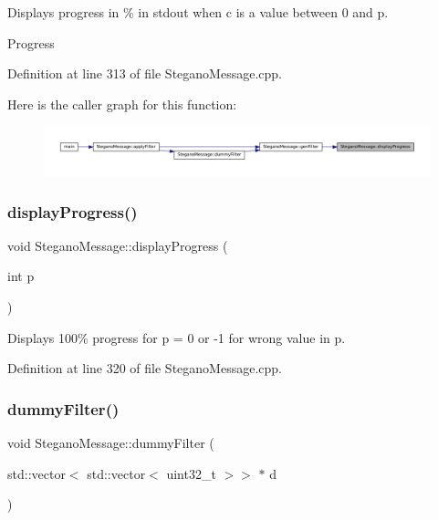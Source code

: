 Displays progress in \% in stdout when c is a value between 0 and p. 

Progress 

Definition at line 313 of file Stegano\+Message.\+cpp.

Here is the caller graph for this function\+:
\nopagebreak
\begin{figure}[H]
\begin{center}
\leavevmode
\includegraphics[width=350pt]{classSteganoMessage_a50936bb2352eaaa1112280c2ac3ca2d5_icgraph}
\end{center}
\end{figure}
\mbox{\label{classSteganoMessage_aa6e24f6ed5afcf38dcba28fb91a74d21}} 
\subsubsection{\texorpdfstring{displayProgress()}{displayProgress()}\hspace{0.1cm}{\footnotesize\ttfamily [2/2]}}
{\footnotesize\ttfamily void Stegano\+Message\+::display\+Progress (\begin{DoxyParamCaption}\item[{int}]{p }\end{DoxyParamCaption})\hspace{0.3cm}{\ttfamily [private]}}



Displays 100\% progress for p = 0 or -\/1 for wrong value in p. 



Definition at line 320 of file Stegano\+Message.\+cpp.

\mbox{\label{classSteganoMessage_a1a26242c2e6d146cba1ad6831ab60ba7}} 
\subsubsection{\texorpdfstring{dummyFilter()}{dummyFilter()}}
{\footnotesize\ttfamily void Stegano\+Message\+::dummy\+Filter (\begin{DoxyParamCaption}\item[{std\+::vector$<$ std\+::vector$<$ uint32\+\_\+t $>$$>$ $\ast$}]{d }\end{DoxyParamCaption})\hspace{0.3cm}{\ttfamily [private]}}



